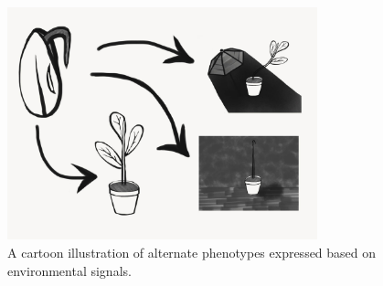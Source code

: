\begin{figure} \label{figs/plant_developmental_perturbation}
  \includegraphics[width=0.8\textwidth]{img/plant_developmental_perturbation.jpg}
  \captionsetup{singlelinecheck=off,justification=raggedright}
  \caption{A cartoon illustration of alternate phenotypes expressed based on environmental signals.}
\end{figure}
